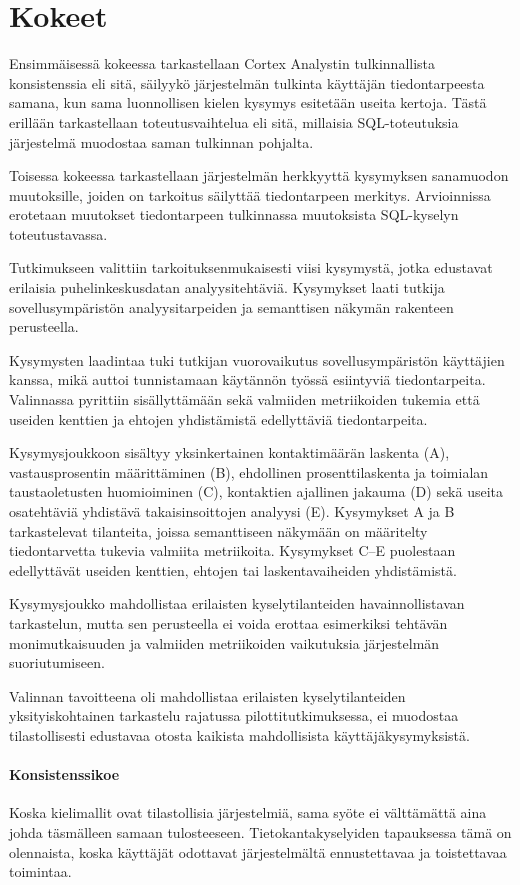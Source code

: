 \section{Kokeet}\label{sec:experiments}
Ensimmäisessä kokeessa tarkastellaan Cortex Analystin tulkinnallista
konsistenssia eli sitä, säilyykö järjestelmän tulkinta käyttäjän
tiedontarpeesta samana, kun sama luonnollisen kielen kysymys esitetään
useita kertoja. Tästä erillään tarkastellaan toteutusvaihtelua eli sitä,
millaisia SQL-toteutuksia järjestelmä muodostaa saman tulkinnan pohjalta.

Toisessa kokeessa tarkastellaan järjestelmän herkkyyttä kysymyksen
sanamuodon muutoksille, joiden on tarkoitus säilyttää tiedontarpeen
merkitys. Arvioinnissa erotetaan muutokset tiedontarpeen tulkinnassa
muutoksista SQL-kyselyn toteutustavassa.

Tutkimukseen valittiin tarkoituksenmukaisesti viisi kysymystä, jotka edustavat erilaisia puhelinkeskusdatan analyysitehtäviä. Kysymykset laati tutkija sovellusympäristön analyysitarpeiden ja semanttisen näkymän rakenteen perusteella.

Kysymysten laadintaa tuki tutkijan vuorovaikutus sovellusympäristön käyttäjien kanssa, mikä auttoi tunnistamaan käytännön työssä esiintyviä tiedontarpeita. Valinnassa pyrittiin sisällyttämään sekä valmiiden metriikoiden tukemia että useiden kenttien ja ehtojen yhdistämistä edellyttäviä tiedontarpeita.

Kysymysjoukkoon sisältyy yksinkertainen kontaktimäärän laskenta
(A), vastausprosentin määrittäminen (B), ehdollinen
prosenttilaskenta ja toimialan taustaoletusten huomioiminen (C),
kontaktien ajallinen jakauma (D) sekä useita osatehtäviä
yhdistävä takaisinsoittojen analyysi (E). Kysymykset A ja B
tarkastelevat tilanteita, joissa semanttiseen näkymään on
määritelty tiedontarvetta tukevia valmiita metriikoita.
Kysymykset C--E puolestaan edellyttävät useiden kenttien,
ehtojen tai laskentavaiheiden yhdistämistä.

Kysymysjoukko mahdollistaa erilaisten kyselytilanteiden havainnollistavan tarkastelun, mutta sen perusteella ei voida erottaa esimerkiksi tehtävän monimutkaisuuden ja valmiiden metriikoiden vaikutuksia järjestelmän suoriutumiseen.

Valinnan tavoitteena oli mahdollistaa erilaisten
kyselytilanteiden yksityiskohtainen tarkastelu rajatussa
pilottitutkimuksessa, ei muodostaa tilastollisesti edustavaa
otosta kaikista mahdollisista käyttäjäkysymyksistä.

\paragraph{Konsistenssikoe}
Koska kielimallit ovat tilastollisia järjestelmiä, sama syöte ei välttämättä aina johda täsmälleen samaan tulosteeseen. Tietokantakyselyiden tapauksessa tämä on olennaista, koska käyttäjät odottavat järjestelmältä ennustettavaa ja toistettavaa toimintaa.

